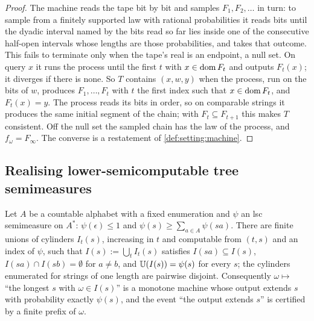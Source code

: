 \begin{proof}
The machine reads the tape bit by bit and samples $F_1,F_2,\dots$ in turn: to sample from a finitely supported law with rational probabilities it reads bits until the dyadic interval named by the bits read so far lies inside one of the consecutive half-open intervals whose lengths are those probabilities, and takes that outcome. This fails to terminate only when the tape's real is an endpoint, a null set. On query $x$ it runs the process until the first $t$ with $x\in\operatorname{dom} F_t$ and outputs $F_t(x)$; it diverges if there is none. So $T$ contains $(x,w,y)$ when the process, run on the bits of $w$, produces $F_1,\dots,F_t$ with $t$ the first index such that $x\in\operatorname{dom} F_t$, and $F_t(x)=y$. The process reads its bits in order, so on comparable strings it produces the same initial segment of the chain; with $F_t\subseteq F_{t+1}$ this makes $T$ consistent. Off the null set the sampled chain has the law of the process, and $f_\omega=F_\infty$. The converse is a restatement of \cref{def:setting:machine}.
\end{proof}

\subsection{Realising lower-semicomputable tree semimeasures}\label{app:setting:realise}

\begin{lemma}\label{lem:setting:realise}
Let $A$ be a countable alphabet with a fixed enumeration and $\psi$ an lsc semimeasure on $A^*$: $\psi(\epsilon)\le1$ and $\psi(s)\ge\sum_{a\in A}\psi(sa)$. There are finite unions of cylinders $I_t(s)$, increasing in $t$ and computable from $(t,s)$ and an index of $\psi$, such that $I(s):=\bigcup_tI_t(s)$ satisfies $I(sa)\subseteq I(s)$, $I(sa)\cap I(sb)=\emptyset$ for $a\ne b$, and $\mathbb{U}(I(s))=\psi(s)$ for every $s$; the cylinders enumerated for strings of one length are pairwise disjoint. Consequently $\omega\mapsto$ ``the longest $s$ with $\omega\in I(s)$'' is a monotone machine whose output extends $s$ with probability exactly $\psi(s)$, and the event ``the output extends $s$'' is certified by a finite prefix of $\omega$.
\end{lemma}

